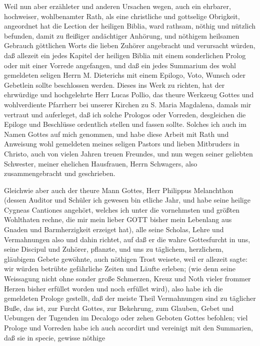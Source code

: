 Weil nun aber erzähleter und anderen Ursachen wegen, auch ein ehrbarer, hochweiser, wohlbenamter Rath, als eine christliche und gottselige Obrigkeit, angeordnet hat die Lection der heiligen Biblia, ward rathsam, nöthig und nützlich befunden, damit zu fleißiger andächtiger Anhörung, und nöthigem heilsamen Gebrauch göttlichen Worts die lieben Zuhörer angebracht und verursacht würden, daß allezeit ein jedes Kapitel der heiligen Biblia mit einem sonderlichen Prolog oder mit einer Vorrede angefangen, und daß ein jedes Summarium des wohl gemeldeten seligen Herrn M. Dieterichs mit einem Epilogo, Voto, Wunsch oder Gebetlein sollte beschlossen werden. Dieses ins Werk zu richten, hat der ehrwürdige und hochgelehrte Herr Lucas Pollio, das theure Werkzeug Gottes und wohlverdiente Pfarrherr bei unserer Kirchen zu S. Maria Magdalena, damals mir vertraut und auferleget, daß ich solche Prologos oder Vorreden, desgleichen die Epiloge und Beschlüsse ordentlich stellen und fassen sollte. Solches ich auch im Namen Gottes auf mich genommen, und habe diese Arbeit mit Rath und Anweisung wohl gemeldeten meines seligen Pastors und lieben Mitbruders in Christo, auch von vielen Jahren treuen Freundes, und nun wegen seiner geliebten Schwester, meiner ehelichen Hausfrauen, Herrn Schwagers, also zusammengebracht und geschrieben.

Gleichwie aber auch der theure Mann Gottes, Herr Philippus Melanchthon (dessen Auditor und Schüler ich gewesen bin etliche Jahr, und habe seine heilige Cygneas Cantiones angehört, welches ich unter die vornehmsten und größten Wohlthaten rechne, die mir mein lieber GOTT bisher mein Lebenlang aus Gnaden und Barmherzigkeit erzeiget hat), alle seine Scholas, Lehre und Vermahnungen also und dahin richtet, auf daß er die wahre Gottesfurcht in uns, seine Discipul und Zuhörer, pflanzte, und uns zu täglichem, herzlichem, gläubigem Gebete gewöhnte, auch nöthigen Trost weisete, weil er allezeit sagte: wir würden betrübte gefährliche Zeiten und Läufte erleben; (wie denn seine Weissagung nicht ohne sonder große Schmerzen, Kreuz und Noth vieler frommer Herzen bisher erfüllet worden und noch erfüllet wird), also habe ich die gemeldeten Prologe gestellt, daß der meiste Theil Vermahnungen sind zu täglicher Buße, das ist, zur Furcht Gottes, zur Bekehrung, zum Glauben, Gebet und Uebungen der Tugenden im Decalogo oder zehen Geboten Gottes befohlen; viel Prologe und Vorreden habe ich auch accordirt und vereinigt mit den Summarien, daß sie in specie, gewisse nöthige


